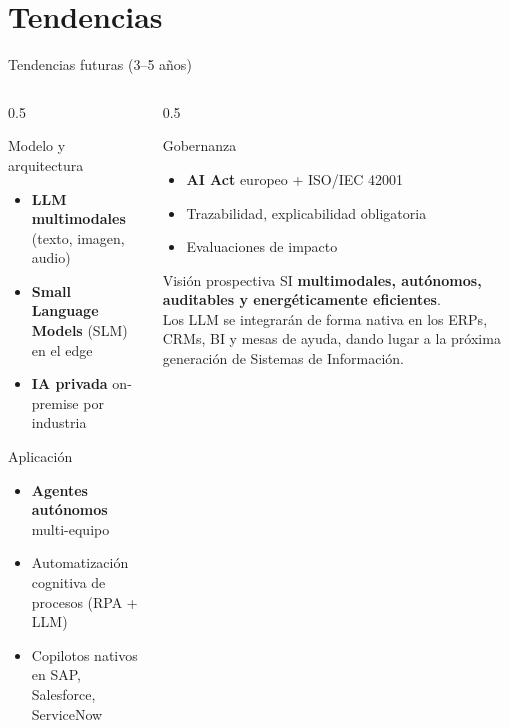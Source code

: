 \documentclass[10pt,aspectratio=169]{beamer}
\begin{document}
\section{Tendencias}
\begin{frame}{Tendencias futuras (3--5 años)}
    \begin{columns}[T]
        \begin{column}{0.5\textwidth}
            \begin{block}{Modelo y arquitectura}
                \begin{itemize}
                    \item \textbf{LLM multimodales} (texto, imagen, audio)
                    \item \textbf{Small Language Models} (SLM) en el edge
                    \item \textbf{IA privada} on-premise por industria
                \end{itemize}
            \end{block}
            \begin{block}{Aplicación}
                \begin{itemize}
                    \item \textbf{Agentes autónomos} multi-equipo
                    \item Automatización cognitiva de procesos (RPA + LLM)
                    \item Copilotos nativos en SAP, Salesforce, ServiceNow
                \end{itemize}
            \end{block}
        \end{column}
        \begin{column}{0.5\textwidth}
            \begin{block}{Gobernanza}
                \begin{itemize}
                    \item \textbf{AI Act} europeo + ISO/IEC 42001
                    \item Trazabilidad, explicabilidad obligatoria
                    \item Evaluaciones de impacto
                \end{itemize}
            \end{block}
            \begin{alertblock}{Visión prospectiva}
                \centering SI \textbf{multimodales, autónomos, auditables y energéticamente eficientes}.\\[0.2cm]
                \small Los LLM se integrarán de forma nativa en los ERPs, CRMs, BI y mesas de ayuda, dando lugar a la próxima generación de Sistemas de Información.
            \end{alertblock}
        \end{column}
    \end{columns}
\end{frame}
\end{document}
